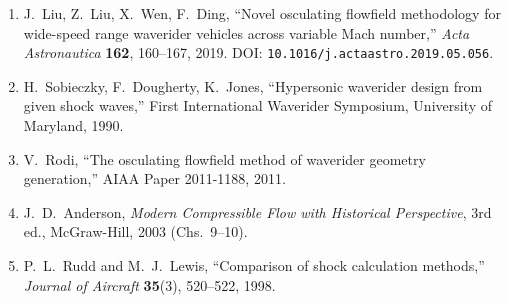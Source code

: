 \documentclass[11pt,a4paper]{article}
\begin{document}
\begin{enumerate}
\item J.~Liu, Z.~Liu, X.~Wen, F.~Ding, ``Novel osculating flowfield
      methodology for wide-speed range waverider vehicles across
      variable Mach number,'' \textit{Acta Astronautica} \textbf{162},
      160--167, 2019. DOI: \texttt{10.1016/j.actaastro.2019.05.056}.
\item H.~Sobieczky, F.~Dougherty, K.~Jones, ``Hypersonic waverider
      design from given shock waves,'' First International Waverider
      Symposium, University of Maryland, 1990.
\item V.~Rodi, ``The osculating flowfield method of waverider
      geometry generation,'' AIAA Paper 2011-1188, 2011.
\item J.~D.~Anderson, \textit{Modern Compressible Flow with Historical
      Perspective}, 3rd ed., McGraw-Hill, 2003 (Chs.~9--10).
\item P.~L.~Rudd and M.~J.~Lewis, ``Comparison of shock calculation
      methods,'' \textit{Journal of Aircraft} \textbf{35}(3),
      520--522, 1998.
\end{enumerate}
\end{document}
